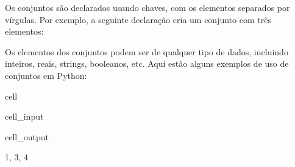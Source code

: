 \documentclass[letterpaper,10pt,english]{jupyterBook}
\begin{document}
\sphinxAtStartPar
Os conjuntos são declarados usando chaves, com os elementos separados por vírgulas. Por exemplo, a seguinte declaração cria um conjunto com três elementos:

\begin{sphinxVerbatim}[commandchars=\\\{\}]
    
\end{sphinxVerbatim}

\sphinxAtStartPar
Os elementos dos conjuntos podem ser de qualquer tipo de dados, incluindo inteiros, reais, strings, booleanos, etc.
Aqui estão alguns exemplos de uso de conjuntos em Python:

\begin{sphinxuseclass}{cell}\begin{sphinxVerbatimInput}

\begin{sphinxuseclass}{cell_input}
\begin{sphinxVerbatim}[commandchars=\\\{\}]
    



\end{sphinxVerbatim}

\end{sphinxuseclass}\end{sphinxVerbatimInput}
\begin{sphinxVerbatimOutput}

\begin{sphinxuseclass}{cell_output}
\begin{sphinxVerbatim}[commandchars=\\\{\}]
\PYGZob{}1, 3, 4\PYGZcb{}
\end{sphinxVerbatim}

\end{sphinxuseclass}\end{sphinxVerbatimOutput}

\end{sphinxuseclass}
\end{document}

